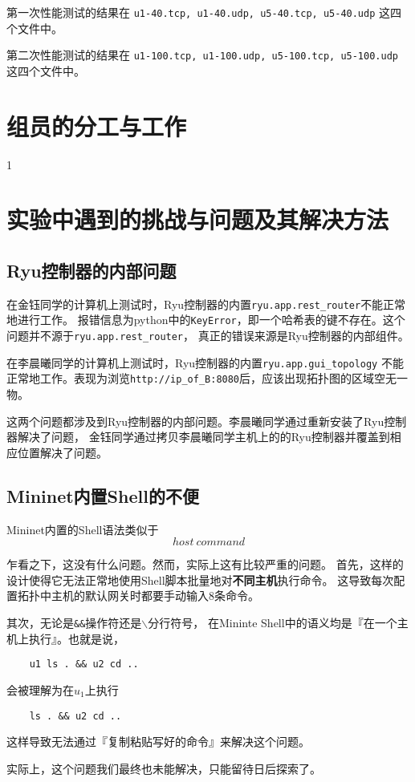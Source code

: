 第一次性能测试的结果在 \texttt{u1-40.tcp, u1-40.udp, u5-40.tcp, u5-40.udp} 这四个文件中。

第二次性能测试的结果在 \texttt{u1-100.tcp, u1-100.udp, u5-100.tcp, u5-100.udp} 这四个文件中。

\section{组员的分工与工作}

1\cite{long2015fully}

\section{实验中遇到的挑战与问题及其解决方法}

\subsection{Ryu控制器的内部问题}

在金钰同学的计算机上测试时，Ryu控制器的内置\texttt{ryu.app.rest\_router}不能正常地进行工作。
报错信息为python中的\texttt{KeyError}，即一个哈希表的键不存在。这个问题并不源于\texttt{ryu.app.rest\_router}，
真正的错误来源是Ryu控制器的内部组件。

在李晨曦同学的计算机上测试时，Ryu控制器的内置\texttt{ryu.app.gui\_topology}
不能正常地工作。表现为浏览\texttt{http://ip\_of\_B:8080}后，应该出现拓扑图的区域空无一物。

这两个问题都涉及到Ryu控制器的内部问题。李晨曦同学通过重新安装了Ryu控制器解决了问题，
金钰同学通过拷贝李晨曦同学主机上的的Ryu控制器并覆盖到相应位置解决了问题。

\subsection{Mininet内置Shell的不便}

Mininet内置的Shell语法类似于
$$ host\ command $$

乍看之下，这没有什么问题。然而，实际上这有比较严重的问题。
首先，这样的设计使得它无法正常地使用Shell脚本批量地对\textbf{不同主机}执行命令。
这导致每次配置拓扑中主机的默认网关时都要手动输入8条命令。

其次，无论是\texttt{\&\&}操作符还是\texttt{$\backslash$}分行符号，
在Mininte Shell中的语义均是『在一个主机上执行』。也就是说，

\begin{lstlisting}
	u1 ls . && u2 cd ..
\end{lstlisting}

会被理解为在$u_1$上执行

\begin{lstlisting}
	ls . && u2 cd ..
\end{lstlisting}

这样导致无法通过『复制粘贴写好的命令』来解决这个问题。

实际上，这个问题我们最终也未能解决，只能留待日后探索了。


